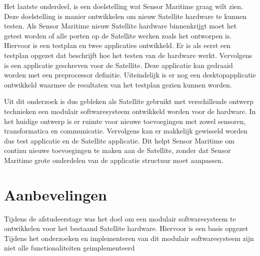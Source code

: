 \noindent Het laatste onderdeel, is een doelstelling wat Sensor Maritime graag wilt zien. Deze doelstelling is manier ontwikkelen om nieuw Satellite hardware te kunnen testen. Als Sensor Maritime nieuw Satellite hardware binnenkrijgt moet het getest worden of alle porten op de Satellite werken zoals het ontworpen is. Hiervoor is een testplan en twee applicaties ontwikkeld. Er is als eerst een testplan opgezet dat beschrijft hoe het testen van de hardware werkt. Vervolgens is een applicatie geschreven voor de Satellite. Deze applicatie kan gedraaid worden met een preprocessor definitie. Uiteindelijk is er nog een desktopapplicatie ontwikkeld waarmee de resultaten van het testplan gezien kunnen worden. \newline

\noindent  Uit dit onderzoek is dus gebleken als Satellite gebruikt met verschillende ontwerp technieken een modulair softwaresysteem ontwikkeld worden voor de hardware. In het huidige ontwerp is er ruimte voor nieuwe toevoegingen met zowel sensoren, transformatica en communicatie. Vervolgens kan er makkelijk gewisseld worden dus test applicatie en de Satellite applicatie. Dit helpt Sensor Maritime om continu nieuwe toevoegingen te maken aan de Satellite, zonder dat Sensor Maritime grote onderdelen van de applicatie structuur moet aanpassen.




\newpage
\section{Aanbevelingen}
Tijdens de afstudeerstage was het doel om een modulair softwaresysteem te ontwikkelen voor het bestaand Satellite hardware. Hiervoor is een basis opgezet Tijdens het onderzoeken en implementeren van dit modulair softwaresysteem zijn niet alle functionaliteiten geimplementeerd